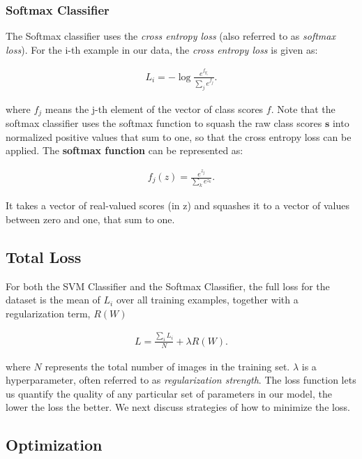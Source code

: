 \subsubsection{Softmax Classifier}
\label{subsubsec:softmaxclassifier}

The Softmax classifier uses the \textit{cross entropy loss} (also referred to as \textit{softmax loss}). For the i-th example in our data, the \textit{cross entropy loss} is given as:

\begin{align}
L_{i} =  - \log \frac {e^{f_{y_i}}} {\sum_{j} e^{f_{j}}}.\label{eqn:softmaxloss}
\end{align}

where $f_{j}$ means the j-th element of the vector of class scores $f$. Note that the softmax classifier uses the softmax function to squash the raw class scores ${\boldsymbol {s}}$ into normalized positive values that sum to one, so that the cross entropy loss can be applied. The \textbf{softmax function} can be represented as:

\begin{align}
f_{j} (z) =  \frac {e^{z_j}} {\sum_{k} e^{z_{k}}}.\label{eqn:softmaxfunction}
\end{align}

It takes a vector of real-valued scores (in z) and squashes it to a vector of values between zero and one, that sum to one.

\subsection{Total Loss}
\label{subsec:totalloss}

For both the SVM Classifier and the Softmax Classifier, the full loss for the dataset is the mean of $L_{i}$ over all training examples, together with a regularization term, $R(W)$

\begin{align}
L =  \frac {\sum_{i} L_{i}} {N} +  \lambda R(W).\label{eqn:totalloss}
\end{align}

where $N$ represents the total number of images in the training set. $\lambda$ is a hyperparameter, often referred to as \textit{regularization strength}. The loss function lets us quantify the quality of any particular set of parameters in our model, the lower the loss the better. We next discuss strategies of how to minimize the loss.

\subsection{Optimization}
\label{subsec:optimization}

